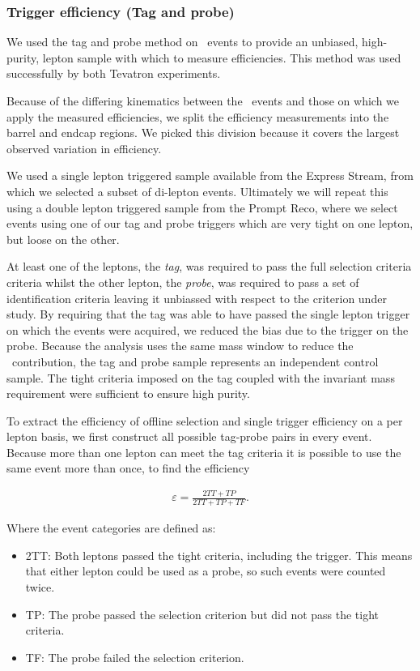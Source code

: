 \subsubsection{Trigger efficiency (Tag and probe)}
 
We used the tag and probe method on \dyll~events to provide an unbiased, high-purity, 
lepton sample with which to measure efficiencies.
This method was used successfully by both Tevatron experiments.

Because of the differing kinematics between the \dyll~events and those on which we apply the measured efficiencies,
we split the efficiency measurements into the barrel and endcap regions.
We picked this division because it covers the largest observed variation in efficiency.

We used a single lepton triggered sample available from the Express Stream, 
from which we selected a subset of di-lepton events.
Ultimately we will repeat this using a double lepton triggered sample from the Prompt Reco,
where we select events using one of our tag and probe triggers which are very tight on one lepton,
but loose on the other.

At least one of the leptons, the {\it tag}, was required to pass the full selection criteria criteria 
whilst the other lepton, the {\it probe}, was required to pass a set of identification criteria leaving 
it unbiassed with respect to the criterion under study. 
By requiring that the tag was able to have passed the single lepton trigger on which the events were acquired, 
we reduced the bias due to the trigger on the probe.
Because the analysis uses the same mass window to reduce the \dyll~contribution, 
the tag and probe sample represents an independent control sample.
The tight criteria imposed on the tag coupled with the invariant mass requirement were sufficient to ensure high purity.

To extract the efficiency of offline selection and single trigger efficiency on a per lepton basis, 
we first construct all possible tag-probe pairs in every event.
Because more than one lepton can meet the tag criteria it is possible to use the same event more than once, to find the efficiency

\begin{eqnarray}
\label{eqn:tagAndProbeEfficiencyEqn}
\varepsilon = \frac{2TT + TP}{2TT + TP + TF}.
\end{eqnarray}

Where the event categories are defined as:

\begin{itemize}
	\item 2TT: Both leptons passed the tight criteria, including the trigger. This means that either lepton could be used as a probe, 
	so such events were counted twice.
	\item TP: The probe passed the selection criterion but did not pass the tight criteria.
	\item TF: The probe failed the selection criterion.
\end{itemize}

